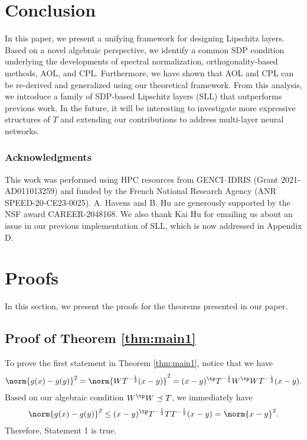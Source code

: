 \documentclass{article} \usepackage{iclr2023_conference,times}
\newcommand{\0}{\mathbf{0} }
\begin{document}
\vspace{-0.1in}
\section{Conclusion}
In this paper, we present a unifying framework for designing Lipschitz layers. Based on a novel algebraic perspective, we identify a common SDP condition underlying the developments of spectral normalization, orthogonality-based methods, AOL, and CPL.
Furthermore, we have shown that AOL and CPL can be re-derived and generalized using our theoretical framework.
From this analysis, we introduce a family of SDP-based Lipschitz layers (SLL) that outperforms previous work.
In the future, it will be interesting to investigate 
more expressive structures of $T$ and extending our contributions to address multi-layer neural networks.

\subsubsection*{Acknowledgments}
 This work was performed using HPC resources from GENCI–IDRIS (Grant 2021-AD011013259) and funded by the French National Research Agency (ANR SPEED-20-CE23-0025). A. Havens and B. Hu are generously supported by the NSF award CAREER-2048168. We also thank Kai Hu for emailing us about an issue in our previous implementation of SLL, which is now addressed in Appendix D.





\newpage
\appendix


\section{Proofs}
In this section, we present the proofs for the theorems presented in our paper.

\subsection{Proof of Theorem \ref{thm:main1}}
To prove the first statement in Theorem \ref{thm:main1}, notice that we have
\begin{align*}
    \norm{g(x)-g(y)}^2=\norm{WT^{-\frac{1}{2}}(x-y)}^2=(x-y)^\tp T^{-\frac{1}{2}} W^\tp W T^{-\frac{1}{2}} (x-y).
\end{align*}
Based on our algebraic condition $W^\tp W\preceq T$, we immediately have
\begin{align*}
    \norm{g(x)-g(y)}^2\le (x-y)^\tp T^{-\frac{1}{2}}TT^{-\frac{1}{2}} (x-y)=\norm{x-y}^2.
\end{align*}
Therefore, Statement 1 is true. 
\end{document}
